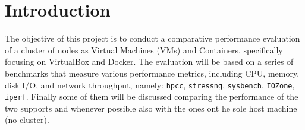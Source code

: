 \section{Introduction}
The objective of this project is to conduct a comparative performance evaluation of a cluster of nodes as Virtual Machines (VMs) and Containers, specifically focusing on VirtualBox and Docker.  
The evaluation will be based on a series of benchmarks that measure various performance metrics, including CPU, memory, disk I/O, and network throughput, namely: \texttt{hpcc}, \texttt{stressng}, \texttt{sysbench}, \texttt{IOZone}, \texttt{iperf}. Finally some of them will be discussed comparing the performance of the two supports and whenever possible also with the ones ont he sole host machine (no cluster).
